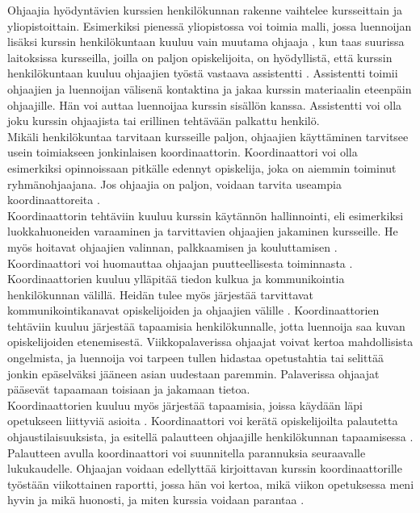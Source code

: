 \documentclass[finnish]{tktltiki2}
\theoremstyle{definition}
\theoremstyle{remark}
\begin{document}
Ohjaajia hyödyntävien kurssien henkilökunnan rakenne vaihtelee kursseittain ja yliopistoittain. Esimerkiksi pienessä yliopistossa voi toimia malli, jossa luennoijan lisäksi kurssin henkilökuntaan kuuluu vain muutama ohjaaja \cite{Dickson11}, kun taas suurissa laitoksissa kursseilla, joilla on paljon opiskelijoita, on hyödyllistä, että kurssin henkilökuntaan kuuluu ohjaajien työstä vastaava assistentti \cite{Reges03}. Assistentti toimii ohjaajien ja luennoijan välisenä kontaktina ja jakaa kurssin materiaalin eteenpäin ohjaajille. Hän voi auttaa luennoijaa kurssin sisällön kanssa. Assistentti voi olla joku kurssin ohjaajista tai erillinen tehtävään palkattu henkilö.
\\
Mikäli henkilökuntaa tarvitaan kursseille paljon, ohjaajien käyttäminen tarvitsee usein toimiakseen jonkinlaisen koordinaattorin. Koordinaattori voi olla esimerkiksi opinnoissaan pitkälle edennyt opiskelija, joka on aiemmin toiminut ryhmänohjaajana. Jos ohjaajia on paljon, voidaan tarvita useampia koordinaattoreita \cite{Roberts95}.
\\
Koordinaattorin tehtäviin kuuluu kurssin käytännön hallinnointi, eli esimerkiksi luokkahuoneiden varaaminen ja tarvittavien ohjaajien jakaminen kursseille. He myös hoitavat ohjaajien valinnan, palkkaamisen ja kouluttamisen \cite{Reges88,Roberts95}. Koordinaattori voi huomauttaa ohjaajan puutteellisesta toiminnasta \cite{Reges88}.
\\
Koordinaattorien kuuluu ylläpitää tiedon kulkua ja kommunikointia henkilökunnan välillä. Heidän tulee myös järjestää tarvittavat kommunikointikanavat opiskelijoiden ja ohjaajien välille \cite{Reges88}. Koordinaattorien tehtäviin kuuluu järjestää tapaamisia henkilökunnalle, jotta luennoija saa kuvan opiskelijoiden etenemisestä. Viikkopalaverissa ohjaajat voivat kertoa mahdollisista ongelmista, ja luennoija voi tarpeen tullen hidastaa opetustahtia tai selittää jonkin epäselväksi jääneen asian uudestaan paremmin. Palaverissa ohjaajat pääsevät tapaamaan toisiaan ja jakamaan tietoa. 
\\
Koordinaattorien kuuluu myös järjestää tapaamisia, joissa käydään läpi opetukseen liittyviä asioita \cite{Reges88, Roberts95}. Koordinaattori voi kerätä opiskelijoilta palautetta ohjaustilaisuuksista, ja esitellä palautteen ohjaajille henkilökunnan tapaamisessa \cite{Patitsas12_2}. Palautteen avulla koordinaattori voi suunnitella parannuksia seuraavalle lukukaudelle. Ohjaajan voidaan edellyttää kirjoittavan kurssin koordinaattorille työstään viikottainen raportti, jossa hän voi kertoa, mikä viikon opetuksessa meni hyvin ja mikä huonosti, ja miten kurssia voidaan parantaa \cite{Hug11}.
\end{document}
